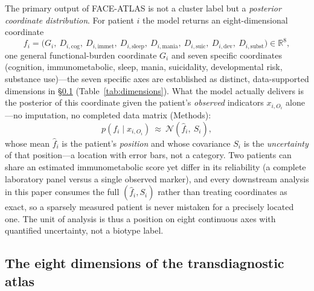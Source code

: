 The primary output of FACE-ATLAS is not a cluster label but a \emph{posterior coordinate
distribution}. For patient $i$ the model returns an eight-dimensional coordinate
\begin{equation}
  f_i=\bigl(G_i,\ D_{i,\mathrm{cog}},\ D_{i,\mathrm{immet}},\
  D_{i,\mathrm{sleep}},\ D_{i,\mathrm{mania}},\ D_{i,\mathrm{suic}},\
  D_{i,\mathrm{dev}},\ D_{i,\mathrm{subst}}\bigr)\in\mathbb{R}^{8},
  \label{eq:res-coord}
\end{equation}
one general functional-burden coordinate $G_i$ and seven specific coordinates
(cognition, immunometabolic, sleep, mania, suicidality, developmental risk,
substance use)---the seven specific axes are established as distinct, data-supported
dimensions in \S\ref{subsec:eightdim} (Table~\ref{tab:dimensions}). What the model
actually delivers is the posterior of this coordinate
given the patient's \emph{observed} indicators $x_{i,O_i}$ alone---no imputation, no
completed data matrix (Methods):
\begin{equation}
  p\!\left(f_i\mid x_{i,O_i}\right)\ \approx\ \mathcal{N}\!\left(\hat f_i,\ S_i\right),
  \label{eq:res-post}
\end{equation}
whose mean $\hat f_i$ is the patient's \emph{position} and whose covariance $S_i$ is the
\emph{uncertainty} of that position---a location with error bars, not a category. Two
patients can share an estimated immunometabolic score yet differ in its reliability (a
complete laboratory panel versus a single observed marker), and every downstream analysis
in this paper consumes the full $(\hat f_i,S_i)$ rather than treating coordinates as exact,
so a sparsely measured patient is never mistaken for a precisely located one. The unit of
analysis is thus a position on eight continuous axes with quantified uncertainty, not a
biotype label.

\subsection{The eight dimensions of the transdiagnostic atlas}\label{subsec:eightdim}

